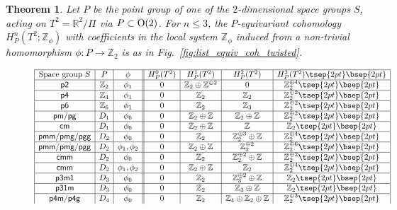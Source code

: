 \documentclass[pdftex]{sigma}
\newtheorem{thm}{Theorem}[section]
\theoremstyle{definition}
\newcommand{\R}{\mathbb{R}}
\newcommand{\Z}{\mathbb{Z}}
\begin{document}
\begin{thm} \label{thm:equiv_coh_twisted}
Let $P$ be the point group of one of the $2$-dimensional space groups $S$, acting on $T^2 = \R^2/\Pi$ via $P \subset {\rm O}(2)$. For $n \le 3$, the $P$-equivariant cohomology $H^n_P(T^2; \Z_\phi)$ with coefficients in the local system $\Z_\phi$ induced from a non-trivial homomorphism $\phi\colon P \to \Z_2$ is as in Fig.~{\rm \ref{fig:list_equiv_coh_twisted}}.
\begin{figure}[htpb]
$$
\begin{array}{|c|c|c||c|c|c|c|}
\hline
\mbox{Space group $S$} & P & \phi &
H^0_P(T^2) & H^1_P(T^2) & H^2_P(T^2) & H^3_P(T^2) \tsep{2pt}\bsep{2pt}\\
\hline
\mbox{\textsf{p2}} & \Z_2 & \phi_1 &
0 & \Z_2 \oplus \Z^{\oplus 2} & 0 & \Z_2^{\oplus 4} \tsep{2pt}\bsep{2pt}\\
\hline
\mbox{\textsf{p4}} & \Z_4 & \phi_1 &
0 & \Z_2 & \Z_2 & \Z_2^{\oplus 2} \tsep{2pt}\bsep{2pt}\\
\hline
\mbox{\textsf{p6}} & \Z_6 & \phi_1 &
0 & \Z_2 & \Z_3 & \Z_2^{\oplus 2} \tsep{2pt}\bsep{2pt}\\
\hline
\mbox{\textsf{pm}/\textsf{pg}} & D_1 & \phi_0 &
0 & \Z_2 \oplus \Z & \Z_2 \oplus \Z & \Z_2^{\oplus 2} \tsep{2pt}\bsep{2pt}\\
\hline
\mbox{\textsf{cm}} & D_1 & \phi_0 &
0 & \Z_2 \oplus \Z & \Z & \Z_2 \tsep{2pt}\bsep{2pt}\\
\hline
\mbox{\textsf{pmm}/\textsf{pmg}/\textsf{pgg}} & D_2 & \phi_0 &
0 & \Z_2 & \Z_2^{\oplus 3} \oplus \Z & \Z_2^{\oplus 4} \tsep{2pt}\bsep{2pt}\\
\hline
\mbox{\textsf{pmm}/\textsf{pmg}/\textsf{pgg}} & D_2 & \phi_1, \phi_2 &
0 & \Z_2 \oplus \Z & \Z_2^{\oplus 2} & \Z_2^{\oplus 6} \tsep{2pt}\bsep{2pt}\\
\hline
\mbox{\textsf{cmm}} & D_2 & \phi_0 &
0 & \Z_2 & \Z_2^{\oplus 2} \oplus \Z & \Z_2^{\oplus 2} \tsep{2pt}\bsep{2pt}\\
\hline
\mbox{\textsf{cmm}} & D_2 & \phi_1, \phi_2 &
0 & \Z_2 \oplus \Z & \Z_2 & \Z_2^{\oplus 4} \tsep{2pt}\bsep{2pt}\\
\hline
\mbox{\textsf{p3m1}} & D_3 & \phi_0 &
0 & \Z_2 & \Z_3^{\oplus 2} \oplus \Z & \Z_2 \tsep{2pt}\bsep{2pt}\\
\hline
\mbox{\textsf{p31m}} & D_3 & \phi_0 &
0 & \Z_2 & \Z_3 \oplus \Z & \Z_2 \tsep{2pt}\bsep{2pt}\\
\hline
\mbox{\textsf{p4m}/\textsf{p4g}} & D_4 & \phi_0 &
0 & \Z_2 & \Z_4 \oplus \Z_2 \oplus \Z & \Z_2^{\oplus 3} \tsep{2pt}\bsep{2pt}\\

\end{array}$$
\end{figure}
\end{thm}
\end{document}
